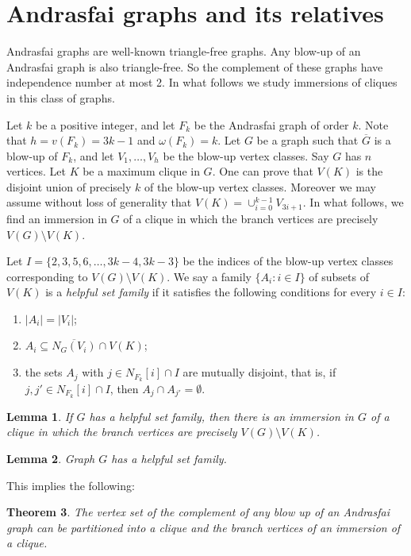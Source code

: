 \documentclass[a4paper,12pt]{article}
\newtheorem{theorem}{Theorem}
\newtheorem{lemma}[theorem]{Lemma}
\begin{document}


\section{Andrasfai graphs and its relatives}

Andrasfai graphs are well-known triangle-free graphs. 
Any blow-up of an Andrasfai graph is also triangle-free.
So the complement of these graphs have independence number at most 2. 
In what follows we study immersions of cliques in this class of graphs. 
 
Let \(k\) be a positive integer, and let \(F_k\) be the Andrasfai graph of order $k$.
Note that \(h = v(F_k) = 3k-1\) and \(\omega(F_k) = k\).
Let \(G\) be a graph such that \(\overline{G}\) is a blow-up of \(F_k\), 
and let \(V_1,\ldots, V_h\) be the blow-up vertex classes.
Say \(G\) has \(n\) vertices.
Let \(K\) be a maximum clique in \(G\).
One can prove that \(V(K)\) is the disjoint union of precisely \(k\) of the blow-up vertex classes.
Moreover we may assume without loss of generality that \(V(K) = \cup_{i=0}^{k-1} V_{3i+1}\).
In what follows, we find an immersion in \(G\) of a clique in which the branch vertices are 
precisely \(V(G)\setminus V(K)\).

Let \(I = \{2,3,5,6,\ldots,3k-4,3k-3\}\) be the indices of the blow-up vertex classes
corresponding to \(V(G)\setminus V(K)\).
We say a family \(\{A_i: i \in I\}\) of subsets of \(V(K)\) is a \emph{helpful set family} 
if it satisfies the following conditions for every \(i \in I\):
\begin{enumerate}
\item \(|A_i| = |V_i|\);
\item \(A_i \subseteq \overline{N_G(V_i)} \cap V(K)\);
\item the sets \(A_j\) with \(j \in N_{F_k}[i]\cap I\) are mutually disjoint, 
  that is, if \(j,j' \in N_{F_k}[i] \cap I\), then \(A_j\cap A_{j'} = \emptyset\).
\end{enumerate}

\begin{lemma}
  If \(G\) has a helpful set family, then there is an immersion in \(G\) of 
  a clique in which the branch vertices are precisely \(V(G)\setminus V(K)\).
\end{lemma}

\begin{lemma}
  Graph \(G\) has a helpful set family. 
\end{lemma}

This implies the following: 

\begin{theorem}
 The vertex set of the complement of any blow up of an Andrasfai graph can be partitioned 
 into a clique and the branch vertices of an immersion of a clique. 
\end{theorem}
\end{document}
